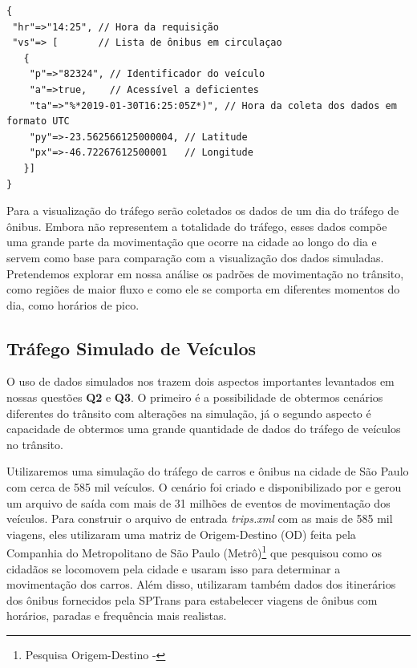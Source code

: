 \begin{lstlisting}[style=myxml, caption={Parte da resposta obitida para a linha 2023}, label=olhovivo.json]
{
 "hr"=>"14:25", // Hora da requisição
 "vs"=> [       // Lista de ônibus em circulaçao
   {
    "p"=>"82324", // Identificador do veículo
    "a"=>true,    // Acessível a deficientes
    "ta"=>"%*2019-01-30T16:25:05Z*)", // Hora da coleta dos dados em formato UTC
    "py"=>-23.562566125000004, // Latitude
    "px"=>-46.72267612500001   // Longitude
   }]
}
\end{lstlisting}

Para a visualização do tráfego serão coletados os dados de um dia do tráfego de
ônibus. Embora não representem a totalidade do tráfego, esses dados compõe uma
grande parte da movimentação que ocorre na cidade ao longo do dia e servem como
base para comparação com a visualização dos dados simuladas. Pretendemos
explorar em nossa análise os padrões de movimentação no trânsito, como regiões
de maior fluxo e como ele se comporta em diferentes momentos do dia, como
horários de pico.

\subsection{Tráfego Simulado de Veículos}
  O uso de dados simulados nos trazem dois aspectos importantes levantados em
nossas questões \textbf{Q2} e \textbf{Q3}. O primeiro é a possibilidade de
obtermos cenários diferentes do trânsito com alterações na simulação, já o
segundo aspecto é capacidade de obtermos uma grande quantidade de dados do
tráfego de veículos no trânsito.

  Utilizaremos uma simulação do tráfego de carros e ônibus na cidade de São
Paulo com cerca de 585 mil veículos. O cenário foi criado e disponibilizado por
\citet{santana2018courb} e gerou um arquivo de saída com mais de 31 milhões de
eventos de movimentação dos veículos. Para construir o arquivo de entrada
\emph{trips.xml} com as mais de 585 mil viagens, eles utilizaram uma matriz de
Origem-Destino (OD) feita pela Companhia do Metropolitano de São Paulo
(Metrô)\footnote{Pesquisa Origem-Destino - } que pesquisou
como os cidadãos se locomovem pela cidade e usaram isso para determinar a
movimentação dos carros.  Além disso, utilizaram também dados dos itinerários
dos ônibus fornecidos pela SPTrans para estabelecer viagens de ônibus com
horários, paradas e frequência mais realistas.

